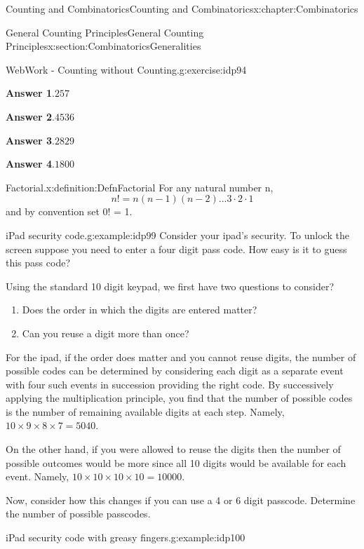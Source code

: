 \documentclass[oneside,10pt,]{book}
\newcommand{\blocktitlefont}{\relax}
\numberwithin{equation}{section}
\begin{document}
\begin{chapterptx}{Counting and Combinatorics}{}{Counting and Combinatorics}{}{}{x:chapter:Combinatorics}
\begin{sectionptx}{General Counting Principles}{}{General Counting Principles}{}{}{x:section:CombinatoricsGeneralities}
\begin{inlineexercise}{WebWork - Counting without Counting.}{g:exercise:idp94}
\par\smallskip%
\noindent\textbf{\blocktitlefont Answer 1}.\hypertarget{g:answer:idp95}{}\quad{}\(257\)%
\par\smallskip%
\noindent\textbf{\blocktitlefont Answer 2}.\hypertarget{g:answer:idp96}{}\quad{}\(4536\)%
\par\smallskip%
\noindent\textbf{\blocktitlefont Answer 3}.\hypertarget{g:answer:idp97}{}\quad{}\(2829\)%
\par\smallskip%
\noindent\textbf{\blocktitlefont Answer 4}.\hypertarget{g:answer:idp98}{}\quad{}\(1800\)%
\end{inlineexercise}%
\begin{definition}{Factorial.}{x:definition:DefnFactorial}%
For any natural number n,%
\begin{equation*}
n! = n(n-1)(n-2) ... 3 \cdot 2 \cdot 1
\end{equation*}
and by convention set 0! = 1.%
\end{definition}
\begin{example}{iPad security code.}{g:example:idp99}%
Consider your ipad's security. To unlock the screen suppose you need to enter a four digit pass code. How easy is it to guess this pass code?%
\par
Using the standard 10 digit keypad, we first have two questions to consider?%
\begin{enumerate}
\item{}Does the order in which the digits are entered matter?%
\item{}Can you reuse a digit more than once?%
\end{enumerate}
For the ipad, if the order does matter and you cannot reuse digits, the number of possible codes can be determined by considering each digit as a separate event with four such events in succession providing the right code. By successively applying the multiplication principle, you find that the number of possible codes is the number of remaining available digits at each step.  Namely, \(10 \times 9 \times 8 \times 7 = 5040.\)%
\par
On the other hand, if you were allowed to reuse the digits then the number of possible outcomes would be more since all 10 digits would be available for each event.  Namely, \(10 \times 10 \times 10 \times 10 = 10000.\)%
\par
Now, consider how this changes if you can use a 4 or 6 digit passcode. Determine the number of possible passcodes.%
\end{example}
\begin{example}{iPad security code with greasy fingers.}{g:example:idp100}%

\end{example}
\end{sectionptx}
\end{chapterptx}
\end{document}
